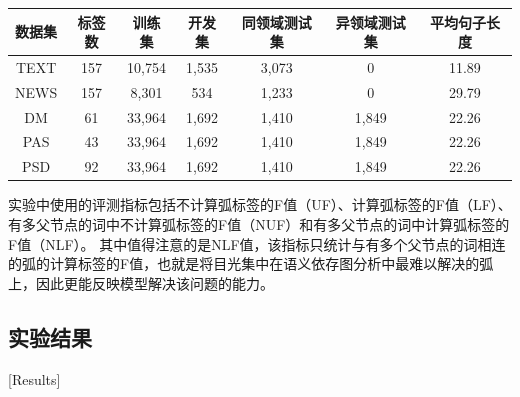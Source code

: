 \begin{table}[htbp]
    \vspace{0.5em}\centering\wuhao
    \begin{tabular}{ccccccc}
        \toprule[1.5pt]
        数据集 & 标签数 & 训练集 & 开发集 & 同领域测试集 & 异领域测试集 & 平均句子长度 \\
        \midrule[1pt]
        TEXT & 157 & 10,754 & 1,535 & 3,073 & 0     & 11.89 \\
        NEWS & 157 & 8,301  & 534   & 1,233 & 0     & 29.79 \\
        DM   & 61  & 33,964 & 1,692 & 1,410 & 1,849 & 22.26 \\
        PAS  & 43  & 33,964 & 1,692 & 1,410 & 1,849 & 22.26 \\
        PSD  & 92  & 33,964 & 1,692 & 1,410 & 1,849 & 22.26 \\
        \bottomrule[1.5pt]
    \end{tabular}
\end{table}

实验中使用的评测指标包括不计算弧标签的F值（UF）、计算弧标签的F值（LF）、有多父节点的词中不计算弧标签的F值（NUF）和有多父节点的词中计算弧标签的F值（NLF）。
其中值得注意的是NLF值，该指标只统计与有多个父节点的词相连的弧的计算标签的F值，也就是将目光集中在语义依存图分析中最难以解决的弧上，因此更能反映模型解决该问题的能力。

\subsection{实验结果}[Results]

